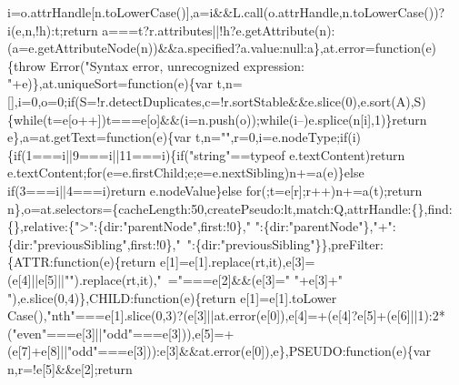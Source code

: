 \begin{DoxyCode}
{       i=o.attrHandle[n.toLowerCase()],a=i&&L.call(o.attrHandle,n.toLowerCase())?i(e,n,!h):t;return
       a===t?r.attributes||!h?e.getAttribute(n):(a=e.getAttributeNode(n))&&a.specified?a.value:null:a\},at.error=function(e)\{throw Error("Syntax error,
       unrecognized expression: "+e)\},at.uniqueSort=function(e)\{var
       t,n=[],i=0,o=0;if(S=!r.detectDuplicates,c=!r.sortStable&&e.slice(0),e.sort(A),S)\{while(t=e[o++])t===e[o]&&(i=n.push(o));while(i--)e.splice(n[i],1)\}return
       e\},a=at.getText=function(e)\{var t,n="",r=0,i=e.nodeType;if(i)\{if(1===i||9===i||11===i)\{if("string"==typeof
       e.textContent)return e.textContent;for(e=e.firstChild;e;e=e.nextSibling)n+=a(e)\}else if(3===i||4===i)return
       e.nodeValue\}else for(;t=e[r];r++)n+=a(t);return
       n\},o=at.selectors=\{cacheLength:50,createPseudo:lt,match:Q,attrHandle:\{\},find:\{\},relative:\{">":\{dir:"parentNode",first:!0\},"
       ":\{dir:"parentNode"\},"+":\{dir:"previousSibling",first:!0\},"~":\{dir:"previousSibling"\}\},preFilter:\{ATTR:function(e)\{return
       e[1]=e[1].replace(rt,it),e[3]=(e[4]||e[5]||"").replace(rt,it),"~="===e[2]&&(e[3]=" "+e[3]+" "),e.slice(0,4)\},CHILD:function(e)\{return
       e[1]=e[1].toLower
      Case(),"nth"===e[1].slice(0,3)?(e[3]||at.error(e[0]),e[4]=+(e[4]?e[5]+(e[6]||1):2*("even"===e[3]||"odd"===e[3])),e[5]=+(e[7]+e[8]||"odd"===e[3])):e[3]&&at.error(e[0]),e\},PSEUDO:function(e)\{var n,r=!e[5]&&e[2];return
       
}
\end{DoxyCode}

